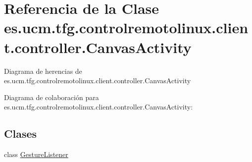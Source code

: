 \hypertarget{classes_1_1ucm_1_1tfg_1_1controlremotolinux_1_1client_1_1controller_1_1CanvasActivity}{\section{Referencia de la Clase es.\-ucm.\-tfg.\-controlremotolinux.\-client.\-controller.\-Canvas\-Activity}
\label{classes_1_1ucm_1_1tfg_1_1controlremotolinux_1_1client_1_1controller_1_1CanvasActivity}
}


Diagrama de herencias de es.\-ucm.\-tfg.\-controlremotolinux.\-client.\-controller.\-Canvas\-Activity


Diagrama de colaboración para es.\-ucm.\-tfg.\-controlremotolinux.\-client.\-controller.\-Canvas\-Activity\-:
\subsection*{Clases}
\begin{DoxyCompactItemize}
\item 
class \hyperlink{classes_1_1ucm_1_1tfg_1_1controlremotolinux_1_1client_1_1controller_1_1CanvasActivity_1_1GestureListener}{Gesture\-Listener}
\end{DoxyCompactItemize}
